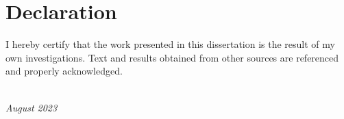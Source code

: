 \chapter*{Declaration}

I hereby certify that the work presented in this dissertation is the result of my own investigations. %
Text and results obtained from other sources are referenced and properly acknowledged.

\begin{flushright}
\it \name\\
August 2023
\end{flushright}

